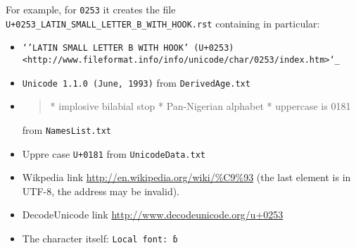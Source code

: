 \documentclass[12]{mwart}
\begin{document}
For example, for \texttt{0253} it creates the file
\texttt{U+0253_LATIN_SMALL_LETTER_B_WITH_HOOK.rst} containing in
particular:

\begin{itemize}
\item \texttt{`'LATIN SMALL LETTER B WITH HOOK' (U+0253) <http://www.fileformat.info/info/unicode/char/0253/index.htm>`_
}
\item \texttt{Unicode 1.1.0 (June, 1993)}
from \texttt{DerivedAge.txt}
\item 
  \begin{quote}
    \obeylines
    	* implosive bilabial stop
	* Pan-Nigerian alphabet
	* uppercase is 0181
  \end{quote}
from \texttt{NamesList.txt}
\item Uppre case \texttt{U+0181} from \texttt{UnicodeData.txt}
\item Wikpedia link \url{http://en.wikipedia.org/wiki/%C9%93} (the last element is in UTF-8, the address may be invalid).
\item DecodeUnicode link \url{http://www.decodeunicode.org/u+0253}
\item The character itself: \texttt{Local font: ɓ}


\end{itemize}
\end{document}
